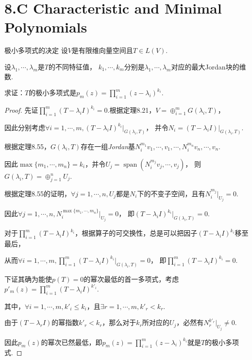 \section{8.C Characteristic and Minimal Polynomials}

\begin{theorem}[8.46]\label{thm 8.46} 极小多项式的决定 \:
    设\(V\)是有限维向量空间且\(T \in L(V)\).

    设\(\lambda_1,\cdots,\lambda_m\)是\(T\)的不同特征值，
    \(k_1,\cdots,k_m\)分别是\(\lambda_1,\cdots,\lambda_m\)对应的最大Jordan块的维数.

    求证：\(T\)的极小多项式是\(p_m(z)=\prod_{i=1}^m (z-\lambda_i)^{k_i}\).
\end{theorem}

\begin{proof}
    先证\(\prod_{i=1}^m (T-\lambda_i I)^{k_i}=0\).根据定理8.21，\(V=\oplus_{i=1}^m G(\lambda_i,T)\)，

    因此分别考虑\(\forall i=1,\cdots,m,(T-\lambda_i I)^{k_i}|_{G(\lambda_i,T)}\)，
    并令\(N_i=(T-\lambda_i I)|_{G(\lambda_i,T)}\).
    
    根据定理8.55，\(G(\lambda_i,T)\)存在一组\textit{Jordan}基\(N_i^{m_1}v_1,\cdots,v_1,\cdots,N_i^{m_n}v_n,\cdots,v_n\).
    
    因此\(\max \{m_1,\cdots,m_n\}=k_i\)，并令\(U_j=\operatorname{span} (N_i^{m_j}v_j,\cdots,v_j)\)，
    则\(G(\lambda_i,T)=\oplus_{j=1}^n U_j\).
    
    根据定理8.55的证明，\(\forall j=1,\cdots,n,U_j\)都是\(N_i\)下的不变子空间，且有\(N_i^{m_j}|_{U_j}=0\).
    
    因此\(\forall j=1,\cdots,n,N_i^{\max \{m_1,\cdots,m_n\}}|_{U_j}=0\)，
    即\((T-\lambda_i I)^{k_i}|_{G(\lambda_i,T)}=0\).
    
    对于\(\prod_{i=1}^m (T-\lambda_i I)^{k_i}\)，根据算子的可交换性，总是可以把因子\((T-\lambda_i I)^{k_i}\)移至最后，
    
    从而\(\forall i=1,\cdots,m,\prod_{i=1}^m (T-\lambda_i I)^{k_i}|_{G(\lambda_i,T)}=0\)，
    即\(\prod_{i=1}^m (T-\lambda_i I)^{k_i}=0\).
    
    下证其确为能使\(p(T)=0\)的幂次最低的首一多项式，考虑\(p'_m(z)=\prod_{i=1}^m (T-\lambda_i I)^{k'_i}\).
    
    其中，\(\forall i=1,\cdots,m,k'_i \leq k_i\)，且\(\exists r=1,\cdots,m,k'_r<k_r\).
    
    由于\((T-\lambda_r I)\)的幂指数\(k'_r<k_r\)，那么对于\(k_r\)所对应的\(U_j\)，必然有\(N_r^{k'_r}|_{U_j} \ne 0\).
    
    因此\(p_m(z)\)的幂次已然最低，即\(p_m(z)=\prod_{i=1}^m (z-\lambda_i)^{k_i}\)就是\(T\)的极小多项式.
\end{proof}

